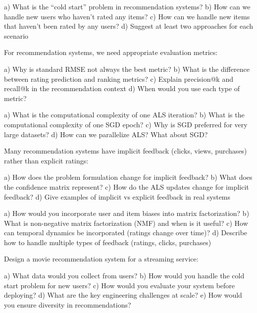 \documentclass{article}
\begin{document}
\begin{problembox}[title=Cold Start Problem]

a) What is the ``cold start'' problem in recommendation systems?
b) How can we handle new users who haven't rated any items?
c) How can we handle new items that haven't been rated by any users?
d) Suggest at least two approaches for each scenario
\end{problembox}

\begin{problembox}[title=Evaluation Metrics]

For recommendation systems, we need appropriate evaluation metrics:

a) Why is standard RMSE not always the best metric?
b) What is the difference between rating prediction and ranking metrics?
c) Explain precision@k and recall@k in the recommendation context
d) When would you use each type of metric?
\end{problembox}

\begin{problembox}[title=Scalability Considerations]

a) What is the computational complexity of one ALS iteration?
b) What is the computational complexity of one SGD epoch?
c) Why is SGD preferred for very large datasets?
d) How can we parallelize ALS? What about SGD?
\end{problembox}

\begin{problembox}[title=Implicit Feedback]

Many recommendation systems have implicit feedback (clicks, views, purchases) rather than explicit ratings:

a) How does the problem formulation change for implicit feedback?
b) What does the confidence matrix represent?
c) How do the ALS updates change for implicit feedback?
d) Give examples of implicit vs explicit feedback in real systems
\end{problembox}

\begin{problembox}[title=Advanced Extensions]

a) How would you incorporate user and item biases into matrix factorization?
b) What is non-negative matrix factorization (NMF) and when is it useful?
c) How can temporal dynamics be incorporated (ratings change over time)?
d) Describe how to handle multiple types of feedback (ratings, clicks, purchases)
\end{problembox}

\begin{problembox}[title=Real-world Implementation]

Design a movie recommendation system for a streaming service:

a) What data would you collect from users?
b) How would you handle the cold start problem for new users?
c) How would you evaluate your system before deploying?
d) What are the key engineering challenges at scale?
e) How would you ensure diversity in recommendations?
\end{problembox}
\end{document}
